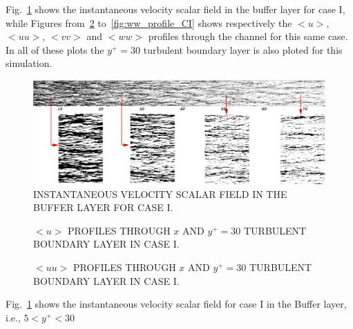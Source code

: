\documentclass[twocolumn,10pt]{asme2e}
\begin{document}
Fig.~\ref{fig:velocity_CI} shows the instantaneous velocity scalar field in the buffer layer for case I, while Figures from~\ref{fig:u_profile_CI} to~\ref{fig:ww_profile_CI} shows respectively the \(<u>\), \(<uu>\), \(<vv>\) and  \(<ww>\) profiles through the channel for this same case. In all of these plots the \(y^+=30\) turbulent boundary layer is also ploted for this simulation.

\begin{figure}[h]

	\includegraphics[width=\textwidth]{streaks.pdf}
	\caption{INSTANTANEOUS VELOCITY SCALAR FIELD IN THE BUFFER LAYER FOR CASE I.}
	\label{fig:velocity_CI}
\end{figure}

\begin{figure}[!htbp]
\begin{center}
\setlength{\unitlength}{0.012500in}%
\end{center}
  \caption{\(<u>\) PROFILES THROUGH \(x\) AND \(y^+=30\) TURBULENT BOUNDARY LAYER IN CASE I.}
  \label{fig:u_profile_CI}
\end{figure}

\begin{figure}[!htbp]
\begin{center}
\end{center}
  \caption{\(<uu>\) PROFILES THROUGH \(x\) AND \(y^+=30\) TURBULENT BOUNDARY LAYER IN CASE I.}
  \label{fig:uu_profile_CI}
\end{figure}


Fig.~\ref{fig:velocity_CI} shows the instantaneous velocity scalar field for case I in the Buffer layer, i.e., \(5<y^+<30\)





\appendix   
\end{document}
